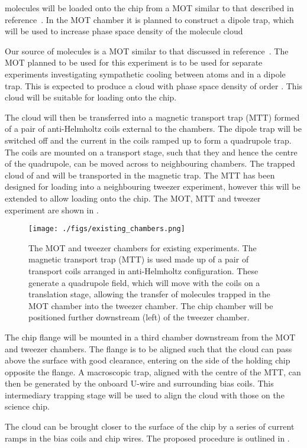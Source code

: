 
\CaF molecules will be loaded onto the chip from a MOT similar to
that described in reference~\cite{Truppe2017}. In the MOT chamber it is planned
to construct a dipole trap, which will be used to increase phase space density
of the molecule cloud

Our source of \CaF molecules is a MOT similar to that discussed in
reference~\cite{Truppe2017}. The MOT planned to be used for this experiment is
to be used for separate experiments investigating sympathetic cooling between
\esRb atoms and \CaF in a dipole trap. This is expected to produce a \CaF
cloud with phase space density of order . This cloud will be suitable
for loading onto the chip. 

The cloud will then be transferred into a magnetic transport trap (MTT) formed of
a pair of anti-Helmholtz coils external to the chambers. The dipole trap will be
switched off and the current in the coils ramped up to form a quadrupole trap.
The coils are mounted on a transport stage, such that they and hence the centre
of the quadrupole, can be moved across to neighbouring chambers. The trapped
cloud of  and  will be transported in the magnetic trap.
The MTT has been designed for loading into a neighbouring tweezer experiment,
however this will be extended to allow loading onto the chip. The MOT, MTT and
tweezer experiment are shown in . 

\begin{figure}[ht]
  \texttt{[image: ./figs/existing\_chambers.png]}
  \caption{
    The MOT and tweezer chambers for existing experiments. The magnetic
    transport trap (MTT) is used made up of a pair of transport coils arranged
    in anti-Helmholtz configuration. These generate a quadrupole field, which
    will move with the coils on a translation stage, allowing the transfer of
    molecules trapped in the MOT chamber into the tweezer chamber. The chip
    chamber will be positioned further downstream (left) of the tweezer chamber.
  }
  \label{experiment:fig:MTTsetup}
\end{figure}

The chip flange will be mounted in a third chamber downstream from the MOT and
tweezer chambers. The flange is to be aligned such that the cloud can pass above
the surface with good clearance, entering on the side of the holding chip opposite
the flange. A macroscopic trap, aligned with the centre of the MTT, can then be
generated by the onboard U-wire and surrounding bias coils. This intermediary
trapping stage will be used to align the cloud with those on the science chip.

The cloud can be brought closer to the surface of the chip by a series of
current ramps in the bias coils and chip wires. The proposed procedure is
outlined in .

